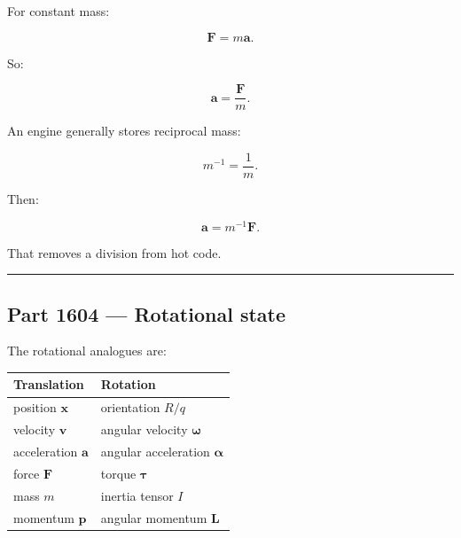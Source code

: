 For constant mass:

\[
\mathbf{F}=m\mathbf{a}.
\]

So:

\[
\mathbf{a}
=
\frac{\mathbf{F}}{m}.
\]

An engine generally stores reciprocal mass:

\[
m^{-1}
=
\frac{1}{m}.
\]

Then:

\[
\mathbf{a}
=
m^{-1}\mathbf{F}.
\]

That removes a division from hot code.

\begin{center}\rule{0.5\linewidth}{0.5pt}\end{center}

\subsection{Part 1604 --- Rotational state}\label{06-engine-ii-ch034-part-1604-rotational-state}

\hypertarget{06-engine-ii-ch034-part-1604-rotational-state}{}

The rotational analogues are:

{\def\LTcaptype{none} %
\begin{longtable}[]{@{}
  >{\raggedright\arraybackslash}p{}
  >{\raggedright\arraybackslash}p{}@{}}
\toprule\noalign{}
\begin{minipage}[b]{\linewidth}\raggedright
Translation
\end{minipage} & \begin{minipage}[b]{\linewidth}\raggedright
Rotation
\end{minipage} \\
\midrule\noalign{}
\endhead
\bottomrule\noalign{}
\endlastfoot
position \(\mathbf{x}\) & orientation \(R/q\) \\
velocity \(\mathbf{v}\) & angular velocity \(\boldsymbol{\omega}\) \\
acceleration \(\mathbf{a}\) & angular acceleration \(\boldsymbol{\alpha}\) \\
force \(\mathbf{F}\) & torque \(\boldsymbol{\tau}\) \\
mass \(m\) & inertia tensor \(I\) \\
momentum \(\mathbf{p}\) & angular momentum \(\mathbf{L}\) \\
\end{longtable}
}

